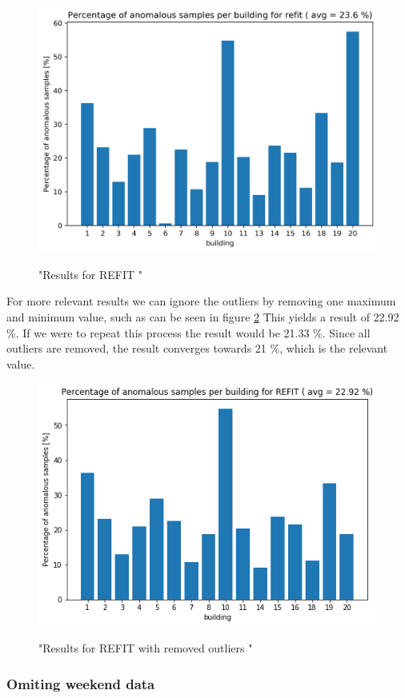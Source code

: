 \begin{figure}[H]
	\centering
	\caption{"Results for REFIT "}
	\includegraphics[width=.8\textwidth]{Figures/EC/refit_res.png}
	\label{fig:refit_res}
\end{figure}

For more relevant results we can ignore the outliers by removing one maximum and minimum value, such as can be seen in figure \ref{fig:refit_res2}
This yields a result of 22.92 \%.
If we were to repeat this process the result would be 21.33 \%.
Since all outliers are removed, the result converges towards 21 \%, which is the relevant value. 

\begin{figure}[H]
	\centering
	\caption{"Results for REFIT with removed outliers "}
	\includegraphics[width=.8\textwidth]{Figures/EC/refit_res2.png}
	\label{fig:refit_res2}
\end{figure}

\subsubsection{Omiting weekend data}

